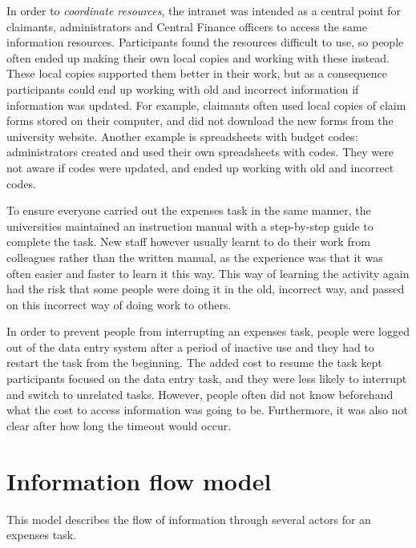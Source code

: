 In order to \textit{coordinate resources}, the intranet was intended as a central point for claimants, administrators and Central Finance officers to access the same information resources. Participants found the resources difficult to use, so people often ended up making their own local copies and working with these instead. These local copies supported them better in their work, but as a consequence participants could end up working with old and incorrect information if information was updated. For example, claimants often used local copies of claim forms stored on their computer, and did not download the new forms from the university website. Another example is spreadsheets with budget codes: administrators created and used their own spreadsheets with codes. They were not aware if codes were updated, and ended up working with old and incorrect codes. 

To ensure everyone carried out the expenses task in the same manner, the universities maintained an instruction manual with a step-by-step guide to complete the task. New staff however usually learnt to do their work from colleagues rather than the written manual, as the experience was that it was often easier and faster to learn it this way. This way of learning the activity again had the risk that some people were doing it in the old, incorrect way, and passed on this incorrect way of doing work to others.

In order to prevent people from interrupting an expenses task, people were logged out of the data entry system after a period of inactive use and they had to restart the task from the beginning. The added cost to resume the task kept participants focused on the data entry task, and they were less likely to interrupt and switch to unrelated tasks. However, people often did not know beforehand what the cost to access information was going to be. Furthermore, it was also not clear after how long the timeout would occur.

\newpage

\section{Information flow model}
This model describes the flow of information through several actors for an expenses task.

